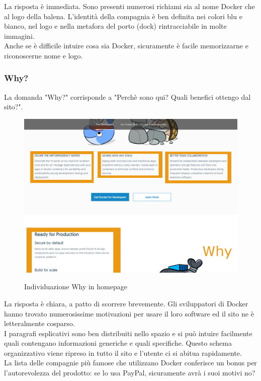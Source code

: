 \documentclass[a4paper]{article}
\begin{document}
\noindent La risposta è immediata. Sono presenti numerosi richiami sia al nome Docker che al logo della balena. L'identità della compagnia è ben definita nei colori blu e bianco, nel logo e nella metafora del porto (dock) rintracciabile in molte immagini.
\\
Anche se è difficile intuire cosa sia Docker, sicuramente è facile memorizzarne e riconoscerne nome e logo.

\subsubsection{Why?}
La domanda "Why?" corrisponde a "Perchè sono qui? Quali benefici ottengo dal sito?".

\begin{figure}[H]
	\centering
	\includegraphics[width=\linewidth]{images/why.png}
    \label{fig:homepagewhy}
    \caption{Individuazione Why in homepage}
\end{figure}

\noindent La risposta è chiara, a patto di scorrere brevemente. Gli sviluppatori di Docker hanno trovato numerosissime motivazioni per usare il loro software ed il sito ne è letteralmente cosparso. 
\\
I paragrafi esplicativi sono ben distribuiti nello spazio e si può intuire facilmente quali contengano informazioni generiche e quali specifiche. Questo schema organizzativo viene ripreso in tutto il sito e l'utente ci si abitua rapidamente.
\\
La lista delle compagnie più famose che utilizzano Docker conferisce un bonus per l'autorevolezza del prodotto: se lo usa PayPal, sicuramente avrà i suoi motivi no?
\end{document}
